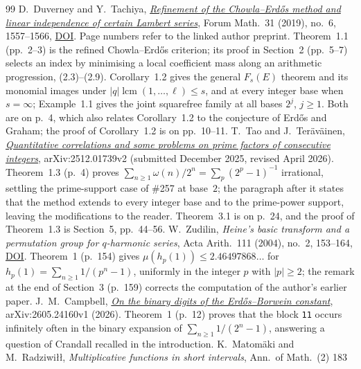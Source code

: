 \begin{thebibliography}{99}
 D.~Duverney and Y.~Tachiya,
  \href{https://danielduverney.fr/documents/theorie-des-nombres/DuverneyTachiya190522.pdf}
  {\emph{Refinement of the Chowla--Erd\H{o}s method and linear independence
  of certain Lambert series}},
  Forum Math.\ 31 (2019), no.~6, 1557--1566,
  \href{https://doi.org/10.1515/forum-2018-0299}{DOI}.  Page numbers refer to
  the linked author preprint.  Theorem~1.1 (pp.~2--3) is the refined
  Chowla--Erd\H{o}s criterion; its proof in Section~2 (pp.~5--7) selects an
  index by minimising a local coefficient mass along an arithmetic
  progression, (2.3)--(2.9).  Corollary~1.2 gives the general $F_s(E)$
  theorem and its monomial images under $|q|\operatorname{lcm}(1,\dots,\ell)\le s$, and at
  every integer base when $s=\infty$; Example~1.1 gives the joint squarefree
  family at all bases \(2^j\), \(j\ge1\).  Both are on p.~4, which also
  relates Corollary~1.2 to the conjecture of Erd\H{o}s and Graham; the proof
  of Corollary~1.2 is on pp.~10--11.
 T.~Tao and J.~Ter\"av\"ainen,
  \href{https://arxiv.org/abs/2512.01739v2}{\emph{Quantitative correlations and
  some problems on prime factors of consecutive integers}}, arXiv:2512.01739v2
  (submitted December 2025, revised April 2026).  Theorem~1.3 (p.~4) proves
  $\sum_{n\ge1}\omega(n)/2^n=\sum_p(2^p-1)^{-1}$ irrational, settling the
  prime-support case of \#257 at base~$2$; the paragraph after it states that
  the method extends to every integer base and to the prime-power support,
  leaving the modifications to the reader.  Theorem~3.1 is on p.~24, and the
  proof of Theorem~1.3 is Section~5, pp.~44--56.
 W.~Zudilin, \emph{Heine's basic transform and a
  permutation group for $q$-harmonic series}, Acta Arith.\ 111 (2004), no.~2,
  153--164, \href{https://doi.org/10.4064/aa111-2-4}{DOI}.  Theorem~1 (p.~154)
  gives $\mu(h_p(1))\le2.46497868\ldots$ for $h_p(1)=\sum_{n\ge1}1/(p^n-1)$,
  uniformly in the integer $p$ with $|p|\ge2$; the remark at the end of
  Section~3 (p.~159) corrects the computation of the author's earlier paper.
 J.~M.~Campbell,
  \href{https://arxiv.org/abs/2605.24160v1}{\emph{On the binary digits of the
  Erd\H{o}s--Borwein constant}}, arXiv:2605.24160v1 (2026).  Theorem~1 (p.~12)
  proves that the block \texttt{11} occurs infinitely often in the binary
  expansion of $\sum_{n\ge1}1/(2^n-1)$, answering a question of Crandall
  recalled in the introduction.
 K.~Matom\"aki and M.~Radziwi\l\l,
  \emph{Multiplicative functions in short intervals}, Ann.\ of Math.\ (2) 183

\end{thebibliography}
